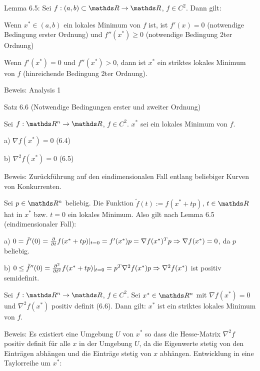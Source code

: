 
Lemma 6.5: Sei $f: (a,b) \subset \R \to \R$, $f \in C^2$. Dann gilt:

\bitm
\item Wenn $x^* \in (a,b)$ ein lokales Minimum von $f$ ist, ist $f'(x) = 0$ (notwendige Bedingung erster Ordnung) und $f''(x^*) \geq 0$ (notwendige Bedingung 2ter Ordnung)
\item Wenn $f'(x^*) = 0$ und $f''(x^*) > 0$, dann ist $x^*$ ein striktes lokales Minimum von $f$ (hinreichende Bedingung 2ter Ordnung).
\eitm

Beweis: Analysis 1


Satz 6.6 (Notwendige Bedingungen erster und zweiter Ordnung)

Sei $f : \R^n \to \R$, $f \in C^2$. $x^*$ sei ein lokales Minimum von $f$.

\bitm
\item a) $\nabla f(x^*) = 0$ (6.4)
\item b) $\nabla^2 f(x^*) = 0$ (6.5)
\eitm

Beweis: Zurückführung auf den eindimensionalen Fall entlang beliebiger Kurven von Konkurrenten.

Sei $p \in \R^n$ beliebig. Die Funktion $\tilde f(t) := f(x^*+tp)$, $t\in \R$ hat in $x^*$ bzw. $t=0$ ein lokales Minimum. Also gilt nach Lemma 6.5 (eindimensionaler Fall):

\bitm
\item a) $0 = \tilde f'(0) = \frac{\partial}{\partial t} f(x^* + tp)|_{t=0} = f'(x^*) p = \nabla f(x^*)^T p \Rightarrow \nabla f(x^*) = 0$, da $p$ beliebig.
\item b) $0 \leq \tilde f''(0) = \frac{\partial^2}{\partial t^2} f(x^* + tp)|_{t=0} = p^T \nabla^2 f(x^*) p \Rightarrow \nabla^2 f(x^*)$ ist positiv semidefinit.
\eitm


Sei $f: \R^n \to \R$, $f \in C^2$. Sei $x^* \in \R^n$ mit $\nabla f(x^*) = 0$ und $\nabla^2 f(x^*)$ positiv definit (6.6). Dann gilt: $x^*$ ist ein striktes lokales Minimum von $f$.

Beweis: Es existiert eine Umgebung $U$ von $x^*$ so dass die Hesse-Matrix $\nabla^2 f$ positiv definit für alle $x$ in der Umgebung $U$, da die Eigenwerte stetig von den Einträgen abhängen und die Einträge stetig von $x$ abhängen.
Entwicklung in eine Taylorreihe um $x^*$:


